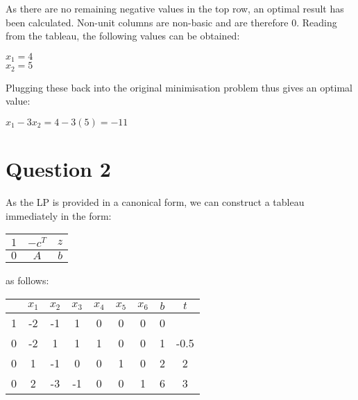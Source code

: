 \documentclass[11pt]{article} %
\begin{document}
As there are no remaining negative values in the top row, an optimal result has been calculated. Non-unit columns are non-basic and are therefore $0$. Reading from the tableau, the following values can be obtained:

\begin{center}

	$x_1 = 4$ \\
	$x_2 = 5$

\end{center}

Plugging these back into the original minimisation problem thus gives an optimal value:

\begin{center}

	$x_1 - 3x_2 = 4 - 3(5) = -11$

\end{center}

\clearpage

\section*{Question 2}

As the LP is provided in a canonical form, we can construct a tableau immediately in the form:

\begin{center}

\begin{tabular}{ c | c | c  }
	$1$ & $-c^T$ & $z$ \\ \hline
	$0$ & $A$ & $b$ \\
\end{tabular}

\end{center}

as follows:

\begin{center}

\begin{tabular}{ c | c c c c c c | c | c  }
    & $x_1$ & $x_2$ & $x_3$ & $x_4$ & $x_5$ & $x_6$ & $b$ & $t$\\ \hline
  1 & -2 & -1 & 1 & 0 & 0 & 0 & 0 &  \\  \hline
  0 & -2 & 1 & 1 & 1 & 0 & 0 & 1 & -0.5 \\
  0 & 1 & -1 & 0 & 0 & 1 & 0 & 2 & 2\\
  0 & 2 & -3 & -1 & 0 & 0 & 1 & 6 & 3\\
\end{tabular}

\end{center}
\end{document}
